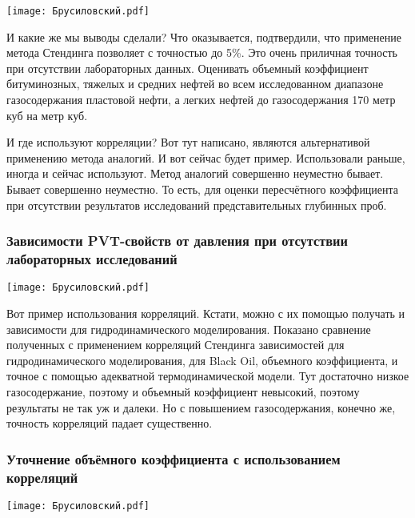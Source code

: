 \documentclass[main.tex]{subfiles}
\begin{document}
\begin{center}
\texttt{[image: Брусиловский.pdf]}
\end{center}

И какие же мы выводы сделали?
Что оказывается, подтвердили, что применение метода Стендинга позволяет с точностью до 5\%.
Это очень приличная точность при отсутствии лабораторных данных.
Оценивать объемный коэффициент битуминозных, тяжелых и средних нефтей во всем исследованном диапазоне газосодержания пластовой нефти, а легких нефтей до газосодержания 170 метр куб на метр куб.

И где используют корреляции?
Вот тут написано, являются альтернативой применению метода аналогий.
И вот сейчас будет пример.
Использовали раньше, иногда и сейчас используют.
Метод аналогий совершенно неуместно бывает.
Бывает совершенно неуместно.
То есть, для оценки пересчётного коэффициента при отсутствии результатов исследований представительных глубинных проб.

\subsubsection{Зависимости PVT-свойств от давления при отсутствии лабораторных исследований}

\begin{center}
\texttt{[image: Брусиловский.pdf]}
\end{center}

Вот пример использования корреляций.
Кстати, можно с их помощью получать и зависимости для гидродинамического моделирования.
Показано сравнение полученных с применением корреляций Стендинга зависимостей для гидродинамического моделирования, для Black Oil, объемного коэффициента, и точное с помощью адекватной термодинамической модели.
Тут достаточно низкое газосодержание, поэтому и объемный коэффициент невысокий, поэтому результаты не так уж и далеки.
Но с повышением газосодержания, конечно же, точность корреляций падает существенно.

\subsubsection{Уточнение объёмного коэффициента с использованием корреляций}

\begin{center}
\texttt{[image: Брусиловский.pdf]}
\end{center}
\end{document}
